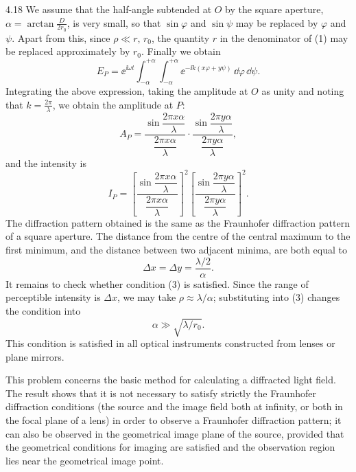 \begin{solution}{4.18}
We assume that the half-angle subtended at $O$ by the square aperture,
$\alpha = \arctan\frac{D}{2r_0}$, is very small, so that $\sin\varphi$ and $\sin\psi$ may be
replaced by $\varphi$ and $\psi$. Apart from this, since $\rho \ll r,\,r_0$, the quantity $r$ in
the denominator of (1) may be replaced approximately by $r_0$. Finally we obtain
\begin{equation*}
E_P = \ee^{\ii\omega t}\int_{-\alpha}^{+\alpha}\!\!\int_{-\alpha}^{+\alpha}
      \ee^{-\ii k(x\varphi+y\psi)}\,\dd\varphi\,\dd\psi .
\end{equation*}
Integrating the above expression, taking the amplitude at $O$ as unity and noting that
$k = \frac{2\pi}{\lambda}$, we obtain the amplitude at $P$:
\begin{equation*}
A_P = \frac{\sin\dfrac{2\pi x\alpha}{\lambda}}{\dfrac{2\pi x\alpha}{\lambda}}
      \cdot
      \frac{\sin\dfrac{2\pi y\alpha}{\lambda}}{\dfrac{2\pi y\alpha}{\lambda}} ,
\end{equation*}
and the intensity is
\begin{equation*}
I_P = \left[\frac{\sin\dfrac{2\pi x\alpha}{\lambda}}
             {\dfrac{2\pi x\alpha}{\lambda}}\right]^2
      \left[\frac{\sin\dfrac{2\pi y\alpha}{\lambda}}
             {\dfrac{2\pi y\alpha}{\lambda}}\right]^2 .
\end{equation*}
The diffraction pattern obtained is the same as the Fraunhofer diffraction pattern of a square
aperture. The distance from the centre of the central maximum to the first minimum, and the
distance between two adjacent minima, are both equal to
\begin{equation*}
\Delta x = \Delta y = \frac{\lambda/2}{\alpha} .
\end{equation*}
It remains to check whether condition (3) is satisfied. Since the range of perceptible intensity
is $\Delta x$, we may take $\rho \approx \lambda/\alpha$; substituting into (3) changes the
condition into
\begin{equation*}
\alpha \gg \sqrt{\lambda/r_0} .
\end{equation*}
This condition is satisfied in all optical instruments constructed from lenses or plane mirrors.

\begin{commentary}
This problem concerns the basic method for calculating a diffracted light field. The result shows
that it is not necessary to satisfy strictly the Fraunhofer diffraction conditions (the source
and the image field both at infinity, or both in the focal plane of a lens) in order to observe
a Fraunhofer diffraction pattern; it can also be observed in the geometrical image plane of the
source, provided that the geometrical conditions for imaging are satisfied and the observation
region lies near the geometrical image point.
\end{commentary}
\end{solution}

